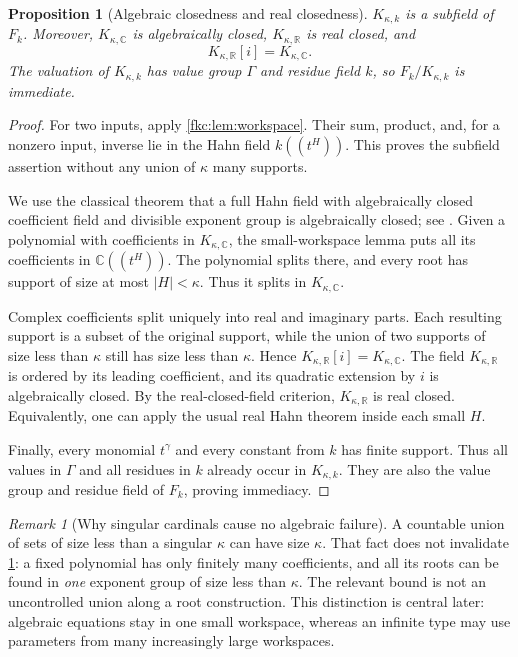 \documentclass[11pt,letterpaper]{article}
\numberwithin{equation}{section}
\newtheorem{proposition}[theorem]{Proposition}
\theoremstyle{definition}
\theoremstyle{remark}
\newtheorem{remark}[theorem]{Remark}
\newcommand{\R}{\mathbb R}
\newcommand{\C}{\mathbb C}
\newcommand{\K}{K_{\kappa,k}}
\newcommand{\KR}{K_{\kappa,\R}}
\newcommand{\KC}{K_{\kappa,\C}}
\begin{document}
\begin{proposition}[Algebraic closedness and real closedness]\label{fkc:prop:closed}
$\K$ is a subfield of $F_k$. Moreover, $\KC$ is algebraically closed, $\KR$ is real closed, and
\[
 \KR[i]=\KC.
\]
The valuation of $\K$ has value group $\Gamma$ and residue field $k$, so $F_k/\K$ is immediate.
\end{proposition}
\begin{proof}
For two inputs, apply \cref{fkc:lem:workspace}. Their sum, product, and, for a nonzero input, inverse lie in the Hahn field $k((t^H))$. This proves the subfield assertion without any union of $\kappa$ many supports.

We use the classical theorem that a full Hahn field with algebraically closed coefficient field and divisible exponent group is algebraically closed; see \cite[Corollary~4]{Poonen}. Given a polynomial with coefficients in $\KC$, the small-workspace lemma puts all its coefficients in $\C((t^H))$. The polynomial splits there, and every root has support of size at most $|H|<\kappa$. Thus it splits in $\KC$.

Complex coefficients split uniquely into real and imaginary parts. Each resulting support is a subset of the original support, while the union of two supports of size less than $\kappa$ still has size less than $\kappa$. Hence $\KR[i]=\KC$. The field $\KR$ is ordered by its leading coefficient, and its quadratic extension by $i$ is algebraically closed. By the real-closed-field criterion, $\KR$ is real closed. Equivalently, one can apply the usual real Hahn theorem inside each small $H$.

Finally, every monomial $t^\gamma$ and every constant from $k$ has finite support. Thus all values in $\Gamma$ and all residues in $k$ already occur in $\K$. They are also the value group and residue field of $F_k$, proving immediacy.
\end{proof}

\begin{remark}[Why singular cardinals cause no algebraic failure]\label{fkc:rem:singular}
A countable union of sets of size less than a singular $\kappa$ can have size $\kappa$. That fact does not invalidate \cref{fkc:prop:closed}: a fixed polynomial has only finitely many coefficients, and all its roots can be found in \emph{one} exponent group of size less than $\kappa$. The relevant bound is not an uncontrolled union along a root construction. This distinction is central later: algebraic equations stay in one small workspace, whereas an infinite type may use parameters from many increasingly large workspaces.
\end{remark}
\end{document}
